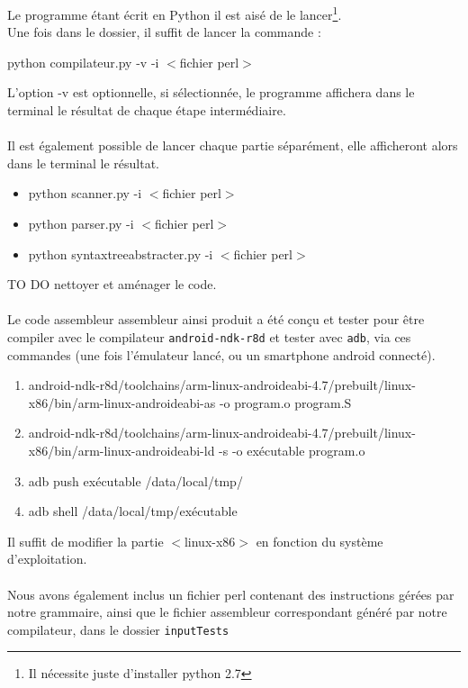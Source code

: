 \documentclass[a4paper,10pt]{article}
\begin{document}
Le programme étant écrit en Python il est aisé de le lancer\footnote{Il nécessite juste d'installer python 2.7}.\\
Une fois dans le dossier, il suffit de lancer la commande :
\begin{center}
	python compilateur.py -v -i  $<$fichier perl$>$
\end{center}
L'option -v est optionnelle, si sélectionnée, le programme affichera dans le terminal le résultat de chaque étape intermédiaire.\\
~\\
Il est également possible de lancer chaque partie séparément, elle afficheront alors dans le terminal le résultat.
\begin{itemize}
	\item python scanner.py -i $<$fichier perl$>$ 
	\item python parser.py -i $<$fichier perl$>$ 
	\item python syntaxtreeabstracter.py -i $<$fichier perl$>$ 
\end{itemize}
TO DO nettoyer et aménager le code.\\
~\\
Le code assembleur assembleur ainsi produit a été conçu et tester pour être compiler avec le compilateur \verb?android-ndk-r8d? et tester avec \verb?adb?, via ces commandes (une fois l'émulateur lancé, ou un smartphone android connecté).
\begin{enumerate}
\item	android-ndk-r8d/toolchains/arm-linux-androideabi-4.7/prebuilt/linux-x86/bin/arm-linux-androideabi-as -o program.o program.S
\item	android-ndk-r8d/toolchains/arm-linux-androideabi-4.7/prebuilt/linux-x86/bin/arm-linux-androideabi-ld -s -o exécutable program.o
\item	adb push exécutable /data/local/tmp/
\item	adb shell /data/local/tmp/exécutable
\end{enumerate}
Il suffit de modifier la partie $<$linux-x86$>$ en fonction du système d'exploitation.\\
~\\
Nous avons également inclus un fichier perl contenant des instructions gérées par notre grammaire, ainsi que le fichier assembleur correspondant généré par notre compilateur, dans le dossier \verb?inputTests?

\end{document}
